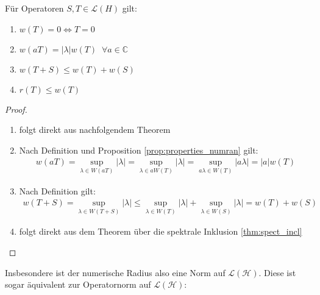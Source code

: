 \begin{cor} \label{cor:norm_num_rad} Für Operatoren $S,T \in \mathcal{L}(H)$ gilt: 
	\begin{enumerate}[label = (\roman*)]
		\item $w(T) = 0 \iff T = 0$
		\item $w(a T) = |\lambda| w(T) \; \; \forall a \in \mathbb{C}$
		\item $w(T+S) \le w(T) + w(S)$
		\item $r(T) \le w(T)$
	\end{enumerate}
\end{cor}
\begin{proof} 
	\begin{enumerate}[label=(\roman*)]
		\item folgt direkt aus nachfolgendem Theorem
		\item Nach Definition und Proposition \ref{prop:properties_numran} gilt:
		\begin{align}
			w(aT) = \sup_{\lambda \in W(aT) } |\lambda| = \sup_{\lambda \in aW(T) } |\lambda| = \sup_{a\lambda \in W(T) } |a\lambda| = |a| w(T) 
		\end{align}
		\item Nach Definition gilt: 
		\begin{align}
			w(T+S) = \sup_{\lambda \in W(T+S) } |\lambda| \le \sup_{\lambda \in W(T) } |\lambda| +\sup_{\lambda \in W(S) } |\lambda| = w(T) + w(S) 
		\end{align}
		\item folgt direkt aus dem Theorem über die spektrale Inklusion \ref{thm:spect_incl}
	\end{enumerate}
\end{proof}

Insbesondere ist der numerische Radius also eine Norm auf $\mathcal{L}(\mathcal{H})$. Diese ist sogar äquivalent zur Operatornorm auf $\mathcal{L}(\mathcal{H})$:

